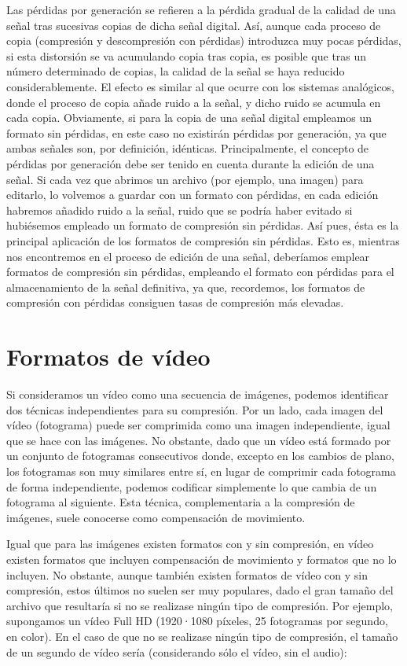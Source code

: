 \documentclass[es,practica]{uah}
\begin{document}
Las pérdidas por generación se refieren a la pérdida gradual de la calidad de una señal tras sucesivas copias de dicha señal digital. Así, aunque cada proceso de copia (compresión y descompresión con pérdidas) introduzca muy pocas pérdidas, si esta distorsión se va acumulando copia tras copia, es posible que tras un número determinado de copias, la calidad de la señal se haya reducido considerablemente. El efecto es similar al que ocurre con los sistemas analógicos, donde el proceso de copia añade ruido a la señal, y dicho ruido se acumula en cada copia. Obviamente, si para la copia de una señal digital empleamos un formato sin pérdidas, en este caso no existirán pérdidas por generación, ya que ambas señales son, por definición, idénticas.
Principalmente, el concepto de pérdidas por generación debe ser tenido en cuenta durante la edición de una señal. Si cada vez que abrimos un archivo (por ejemplo, una imagen) para editarlo, lo volvemos a guardar con un formato con pérdidas, en cada edición habremos añadido ruido a la señal, ruido que se podría haber evitado si hubiésemos empleado un formato de compresión sin pérdidas. Así pues, ésta es la principal aplicación de los formatos de compresión sin pérdidas. Esto es, mientras nos encontremos en el proceso de edición de una señal, deberíamos emplear formatos de compresión sin pérdidas, empleando el formato con pérdidas para el almacenamiento de la señal definitiva, ya que, recordemos, los formatos de compresión con pérdidas consiguen tasas de compresión más elevadas.

\section{Formatos de vídeo}

Si consideramos un vídeo como una secuencia de imágenes, podemos identificar dos técnicas independientes para su compresión. Por un lado, cada imagen del vídeo (fotograma) puede ser comprimida como una imagen independiente, igual que se hace con las imágenes. No obstante, dado que un vídeo está formado por un conjunto de fotogramas consecutivos donde, excepto en los cambios de plano, los fotogramas son muy similares entre sí, en lugar de comprimir cada fotograma de forma independiente, podemos codificar simplemente lo que cambia de un fotograma al siguiente. Esta técnica, complementaria a la compresión de imágenes, suele conocerse como compensación de movimiento.

Igual que para las imágenes existen formatos con y sin compresión, en vídeo existen formatos que incluyen compensación de movimiento y formatos que no lo incluyen. No obstante, aunque también existen formatos de vídeo con y sin compresión, estos últimos no suelen ser muy populares, dado el gran tamaño del archivo que resultaría si no se realizase ningún tipo de compresión. Por ejemplo, supongamos un vídeo Full HD (1920·1080 píxeles, 25 fotogramas por segundo, en color). En el caso de que no se realizase ningún tipo de compresión, el tamaño de un segundo de vídeo sería (considerando sólo el vídeo, sin el audio):
\end{document}
